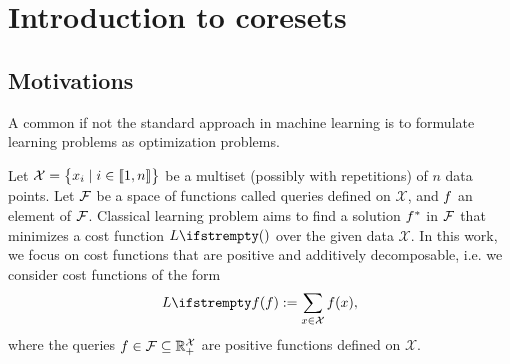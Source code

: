 
\chapter{Introduction to coresets}

\section{Motivations}




A common if not the standard approach in machine learning
is to formulate learning problems as optimization problems.

Let $\mathcal{X}=\begin{Bmatrix}
x_{i} \mid i\in \llbracket 1,n \rrbracket
\end{Bmatrix}$ be a multiset (possibly with repetitions) of $n$ data points. Let $\mathcal{F}$ be a space of functions called queries defined on $\mathcal{X}$, and $f$ an element of $\mathcal{F}$. Classical learning problem aims to find a solution $f ^*$ in $\mathcal{F}$ that minimizes a cost function $\loss{}$ over the given data $\mathcal{X}$. In this work, we focus on cost functions that are positive and additively decomposable, i.e. we consider cost functions of the form
\begin{equation*}
\loss{\query}:=\sum_{x \in \mathcal{X}} \query (x),
\end{equation*}
where the queries $f \in \mathcal{F} \subseteq \mathbb{R}_+^{\mathcal{X}}$ are positive functions defined on $\mathcal{X}$.

